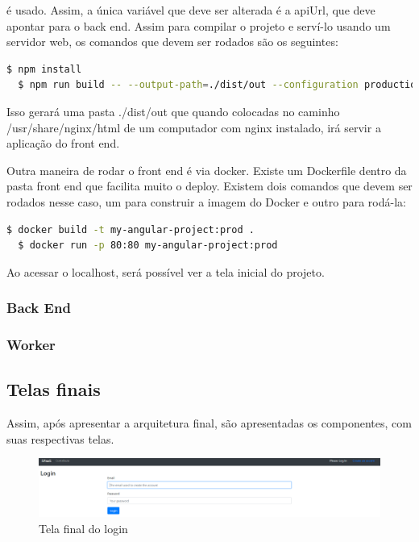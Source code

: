 \documentclass[11pt,twoside]{article}
\begin{document}
é usado. Assim, a única variável que deve ser alterada é a apiUrl, que deve apontar para o back end. Assim para compilar o projeto e serví-lo usando um servidor web, os comandos que 
devem ser rodados são os seguintes: 

\begin{lstlisting}[language=bash]
  $ npm install 
  $ npm run build -- --output-path=./dist/out --configuration production
\end{lstlisting}

Isso gerará uma pasta ./dist/out que quando colocadas no caminho /usr/share/nginx/html de um computador com nginx instalado, irá servir a aplicação do front end.

Outra maneira de rodar o front end é via docker. Existe um Dockerfile dentro da pasta front end que facilita muito o deploy. Existem dois comandos que devem ser rodados nesse caso, um
para construir a imagem do Docker e outro para rodá-la:

\begin{lstlisting}[language=bash]
  $ docker build -t my-angular-project:prod .
  $ docker run -p 80:80 my-angular-project:prod
\end{lstlisting}

Ao acessar o localhost, será possível ver a tela inicial do projeto.

\subsubsection{Back End}

\subsubsection{Worker}

\subsection{Telas finais}



Assim, após apresentar a arquitetura final, são apresentadas os componentes, com suas respectivas telas. 

\begin{figure}[!h]
  \centering
  \includegraphics[scale=0.3]{final_login.eps}
  \caption{Tela final do login}
  \label{fig:finalLogin}
\end{figure}
\end{document}
